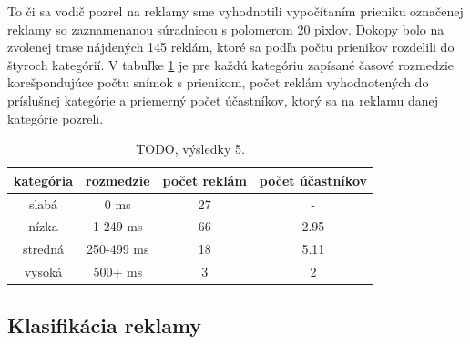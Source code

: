 To či sa vodič pozrel na reklamy sme vyhodnotili vypočítaním prieniku označenej reklamy so zaznamenanou súradnicou s polomerom 20 pixlov. Dokopy bolo na zvolenej trase nájdených 145 reklám, ktoré sa podľa počtu prienikov rozdelili do štyroch kategórií. V tabuľke \ref{table:cat} je pre každú kategóriu zapísané časové rozmedzie korešpondujúce počtu snímok s prienikom, počet reklám vyhodnotených do príslušnej kategórie a priemerný počet účastníkov, ktorý sa na reklamu danej kategórie pozreli.
\\
\begin{table}[ht]
\centering
\begin{tabular}{|c c c c|}
 \hline
 kategória &	rozmedzie &	počet reklám &	počet účastníkov \\ [0.5ex] 
 \hline
slabá &	0 ms &	27 &	- \\ [0.1ex]
nízka &	1-249 ms &	66 &	2.95 \\ [0.1ex]
stredná &	250-499 ms &	18 &	5.11 \\ [0.1ex]
vysoká &	500+ ms &	3 &	2 \\ [0.1ex]
 \hline
\end{tabular}
\caption{TODO, výsledky 5.}
\label{table:cat}
\end{table}

\subsection{Klasifikácia reklamy}







